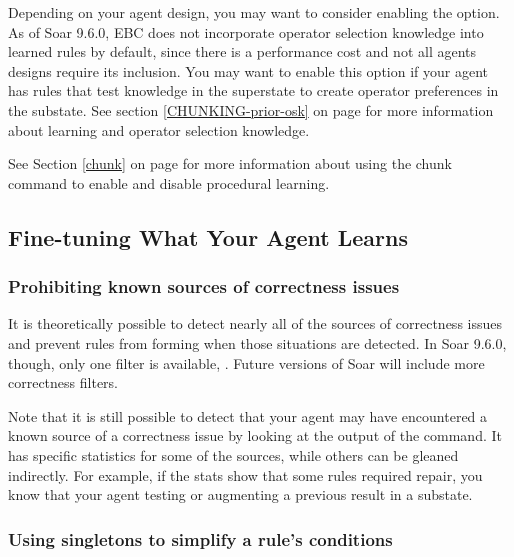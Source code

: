 Depending on your agent design, you may want to consider enabling the  option.  As of Soar 9.6.0, EBC does not incorporate operator selection knowledge into learned rules by default, since there is a performance cost and not all agents designs require its inclusion.  You may want to enable this option if your agent has rules that test knowledge in the superstate to create operator preferences in the substate.  See section \ref{CHUNKING-prior-osk} on page \pageref{CHUNKING-prior-osk} for more information about learning and operator selection knowledge.

See Section \ref{chunk} on page \pageref{chunk} for more information about using the chunk command to enable and disable procedural learning.


\subsection{Fine-tuning What Your Agent Learns}
\label{CHUNKING-usage-tuning}

\subsubsection{Prohibiting known sources of correctness issues}
\label{CHUNKING-usage-tuning-correctness}

It is theoretically possible to detect nearly all of the sources of correctness issues and prevent rules from forming when those situations are detected.  In Soar 9.6.0, though, only one filter is available, .  Future versions of Soar will include more correctness filters.

Note that it is still possible to detect that your agent may have encountered a known source of a correctness issue by looking at the output of the  command.  It has specific statistics for some of the sources, while others can be gleaned indirectly.  For example, if the stats show that some rules required repair, you know that your agent testing or augmenting a previous result in a substate.

\subsubsection{Using singletons to simplify a rule's conditions}
\label{CHUNKING-usage-tuning-conditions}

